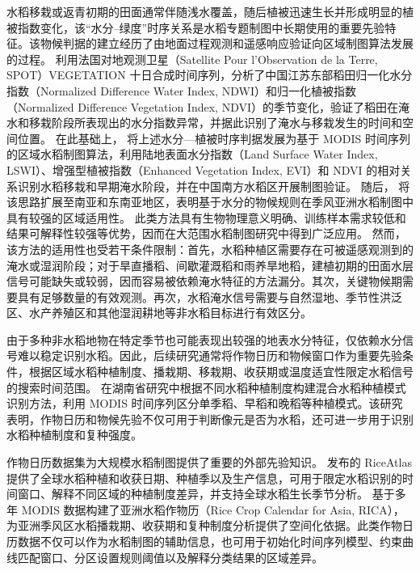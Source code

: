 水稻移栽或返青初期的田面通常伴随浅水覆盖，随后植被迅速生长并形成明显的植被指数变化，该“水分–绿度”时序关系是水稻专题制图中长期使用的重要先验特征。该物候判据的建立经历了由地面过程观测和遥感响应验证向区域制图算法发展的过程。
\citet{Xiao2002} 利用法国对地观测卫星（Satellite Pour l'Observation de la Terre, SPOT）VEGETATION 十日合成时间序列，分析了中国江苏东部稻田归一化水分指数（Normalized Difference Water Index, NDWI）和归一化植被指数（Normalized Difference Vegetation Index, NDVI）的季节变化，验证了稻田在淹水和移栽阶段所表现出的水分指数异常，并据此识别了淹水与移栽发生的时间和空间位置。
在此基础上，\citet{Xiao2005} 将上述水分—植被时序判据发展为基于 MODIS 时间序列的区域水稻制图算法，利用陆地表面水分指数（Land Surface Water Index, LSWI）、增强型植被指数（Enhanced Vegetation Index, EVI）和 NDVI 的相对关系识别水稻移栽和早期淹水阶段，并在中国南方水稻区开展制图验证。
随后，\citet{Xiao2006} 将该思路扩展至南亚和东南亚地区，表明基于水分的物候规则在季风亚洲水稻制图中具有较强的区域适用性。
此类方法具有生物物理意义明确、训练样本需求较低和结果可解释性较强等优势，因而在大范围水稻制图研究中得到广泛应用。
然而，该方法的适用性也受若干条件限制：首先，水稻种植区需要存在可被遥感观测到的淹水或湿润阶段；对于旱直播稻、间歇灌溉稻和雨养旱地稻，建植初期的田面水层信号可能缺失或较弱，因而容易被依赖淹水特征的方法漏分\cite{Fang2024Review}。其次，关键物候期需要具有足够数量的有效观测。再次，水稻淹水信号需要与自然湿地、季节性洪泛区、水产养殖区和其他湿润耕地等非水稻目标进行有效区分。

由于多种非水稻地物在特定季节也可能表现出较强的地表水分特征，仅依赖水分信号难以稳定识别水稻。因此，后续研究通常将作物日历和物候窗口作为重要先验条件，根据区域水稻种植制度、播栽期、移栽期、收获期或温度适宜性限定水稻信号的搜索时间范围。\citet{Peng2011IJAEO} 在湖南省研究中根据不同水稻种植制度构建混合水稻种植模式识别方法，利用 MODIS 时间序列区分单季稻、早稻和晚稻等种植模式。该研究表明，作物日历和物候先验不仅可用于判断像元是否为水稻，还可进一步用于识别水稻种植制度和复种强度。

作物日历数据集为大规模水稻制图提供了重要的外部先验知识。\citet{Laborte2017SciData} 发布的 RiceAtlas 提供了全球水稻种植和收获日期、种植季以及生产信息，可用于限定水稻识别的时间窗口、解释不同区域的种植制度差异，并支持全球水稻生长季节分析。\citet{Mishra2021IJAEO} 基于多年 MODIS 数据构建了亚洲水稻作物历（Rice Crop Calendar for Asia, RICA），为亚洲季风区水稻播栽期、收获期和复种制度分析提供了空间化依据。此类作物日历数据不仅可以作为水稻制图的辅助信息，也可用于初始化时间序列模型、约束曲线匹配窗口、分区设置规则阈值以及解释分类结果的区域差异。

